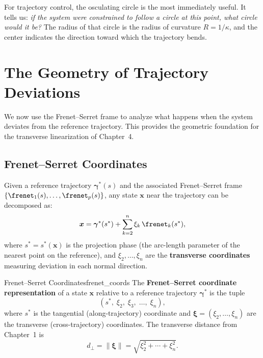 \documentclass[12pt, openany]{book}
\theoremstyle{plain}
\newcommand{\state}{\bm{x}}
\newcommand{\traj}{\bm{\gamma}}
\newcommand{\norm}[1]{\left\lVert #1 \right\rVert}
\begin{document}
For trajectory control, the osculating circle is the most immediately useful.
It tells us: \emph{if the system were constrained to follow a circle at this
point, what circle would it be?} The radius of that circle is the radius of
curvature $R = 1/\kappa$, and the center indicates the direction toward which
the trajectory bends.

\section{The Geometry of Trajectory Deviations}

We now use the Frenet--Serret frame to analyze what happens when the system
deviates from the reference trajectory. This provides the geometric foundation
for the transverse linearization of Chapter~4.

\subsection{Frenet--Serret Coordinates}

Given a reference trajectory $\traj^*(s)$ and the associated Frenet--Serret
frame $\{\frenet_1(s), \ldots, \frenet_p(s)\}$, any state $\state$ near the
trajectory can be decomposed as:
\begin{equation}\label{eq:frenet_coords}
  \state = \traj^*(s^*) + \sum_{k=2}^{n} \xi_k\, \frenet_k(s^*),
\end{equation}
where $s^* = s^*(\state)$ is the projection phase (the arc-length parameter of
the nearest point on the reference), and $\xi_2, \ldots, \xi_n$ are the
\textbf{transverse coordinates} measuring deviation in each normal direction.

\begin{definition}{Frenet--Serret Coordinates}{frenet_coords}
  The \textbf{Frenet--Serret coordinate representation} of a state $\state$ relative
  to a reference trajectory $\traj^*$ is the tuple
  \begin{equation}
    (s^*,\; \xi_2,\; \xi_3,\; \ldots,\; \xi_n),
  \end{equation}
  where $s^*$ is the tangential (along-trajectory) coordinate and
  $\bm{\xi} = (\xi_2, \ldots, \xi_n)$ are the transverse (cross-trajectory)
  coordinates. The transverse distance from Chapter~1 is
  \begin{equation}
    d_\perp = \norm{\bm{\xi}} = \sqrt{\xi_2^2 + \cdots + \xi_n^2}.
  \end{equation}
\end{definition}
\end{document}
